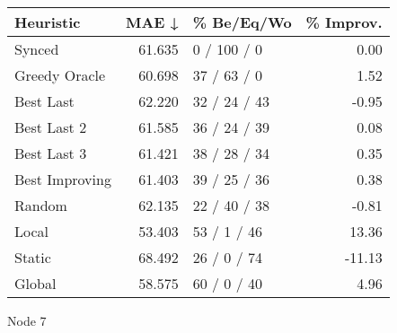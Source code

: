 \begin{tabular}{lrlr}
\toprule
\textbf{Heuristic} & \textbf{MAE ↓} & \textbf{\% Be/Eq/Wo} & \textbf{\% Improv.} \\
\midrule
            Synced &         61.635 &          0 / 100 / 0 &                0.00 \\
     Greedy Oracle &         60.698 &          37 / 63 / 0 &                1.52 \\
         Best Last &         62.220 &         32 / 24 / 43 &               -0.95 \\
       Best Last 2 &         61.585 &         36 / 24 / 39 &                0.08 \\
       Best Last 3 &         61.421 &         38 / 28 / 34 &                0.35 \\
    Best Improving &         61.403 &         39 / 25 / 36 &                0.38 \\
            Random &         62.135 &         22 / 40 / 38 &               -0.81 \\
             Local &         53.403 &          53 / 1 / 46 &               13.36 \\
            Static &         68.492 &          26 / 0 / 74 &              -11.13 \\
            Global &         58.575 &          60 / 0 / 40 &                4.96 \\
\bottomrule
\end{tabular}
\caption{Node 7}
\label{tab:non_lr05_le1_bs2_7}
